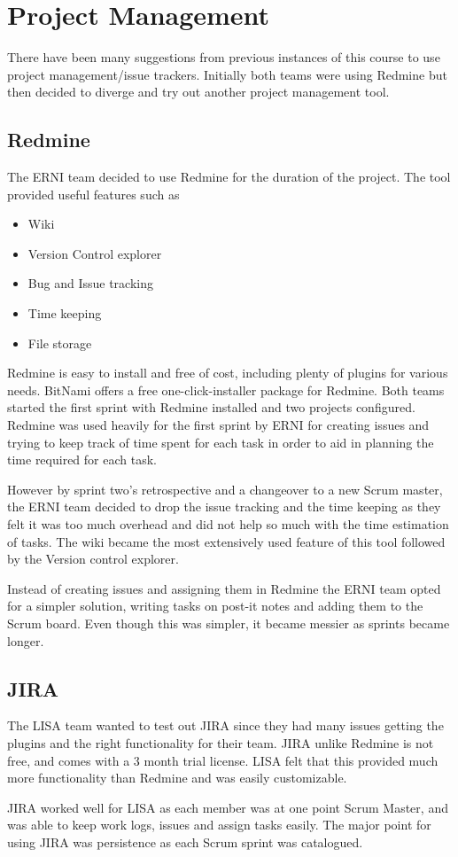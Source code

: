 \section{Project Management}

There have been many suggestions from previous instances of this course to use project management/issue trackers. Initially both teams were using Redmine\cite{redminesite} but then decided to diverge and try out another project management tool. 

\subsection{Redmine}

The ERNI team decided to use Redmine\cite{redminesite} for the duration of the project. The tool provided useful features such as
\begin{itemize}
\item Wiki
\item Version Control explorer
\item Bug and Issue tracking
\item Time keeping
\item File storage
\end{itemize} 

Redmine is easy to install and free of cost, including plenty of plugins for various needs. BitNami offers a free one-click-installer package for Redmine. Both teams started the first sprint with Redmine installed and two projects configured. Redmine was used heavily for the first sprint by ERNI for creating issues and trying to keep track of time spent for each task in order to aid in planning the time required for each task. 

However by sprint two's retrospective and a changeover to a new Scrum master, the ERNI team decided to drop the issue tracking and the time keeping as they felt it was too much overhead and did not help so much with the time estimation of tasks. The wiki became the most extensively used feature of this tool followed by the Version control explorer. 

Instead of creating issues and assigning them in Redmine the ERNI team opted for a simpler solution, writing tasks on post-it notes and adding them to the Scrum board. Even though this was simpler, it became messier as sprints became longer.

\subsection{JIRA}

The LISA team wanted to test out JIRA\cite{jirasite} since they had many issues getting the plugins and the right functionality for their team. JIRA unlike Redmine is not free, and comes with a 3 month trial license. LISA felt that this provided much more functionality than Redmine and was easily customizable.

JIRA worked well for LISA as each member was at one point Scrum Master, and was able to keep work logs, issues and assign tasks easily. The major point for using JIRA was persistence as each Scrum sprint was catalogued.
